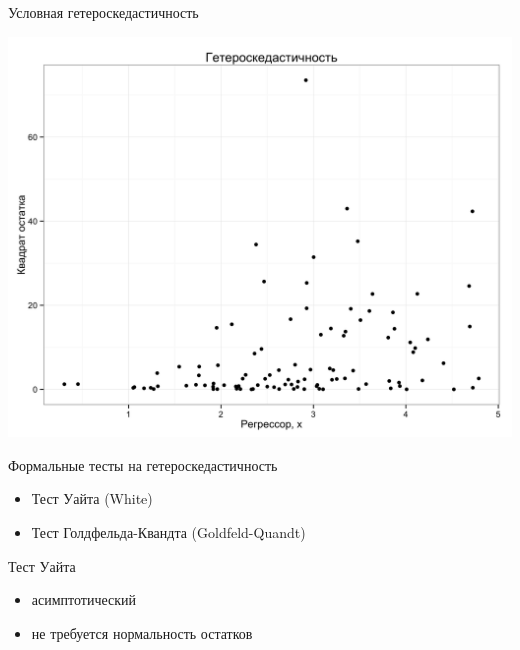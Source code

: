 \documentclass[ignorenonframetext,]{beamer}
\begin{document}
\begin{frame}{Условная гетероскедастичность}

\includegraphics{graph_02_getero.png}

\end{frame}

\begin{frame}{Формальные тесты на гетероскедастичность}

\begin{itemize}
\item
  Тест Уайта (White)
\item
  Тест Голдфельда-Квандта (Goldfeld-Quandt)
\end{itemize}

\end{frame}

\begin{frame}{Тест Уайта}

\begin{itemize}
\item
  асимптотический
\item
  не требуется нормальность остатков
\end{itemize}

\end{frame}
\end{document}
